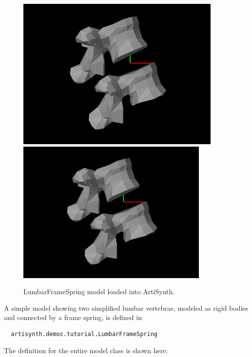 \begin{figure}[ht]
\begin{center}
\iflatexml
 \includegraphics[]{images/LumbarFrameSpring}
\else
 \includegraphics[width=3.75in]{images/LumbarFrameSpring}
\fi
\end{center}
\caption{LumbarFrameSpring model loaded into ArtiSynth.}
\label{LumbarFrameSpring:fig}
\end{figure}

A simple model showing two simplified lumbar vertebrae, modeled as
rigid bodies and connected by a frame spring, is defined in
%
\begin{verbatim}
  artisynth.demos.tutorial.LumbarFrameSpring
\end{verbatim}
%
The definition for the entire model class is shown here:
\lstset{numbers=left}

\lstset{numbers=none}

